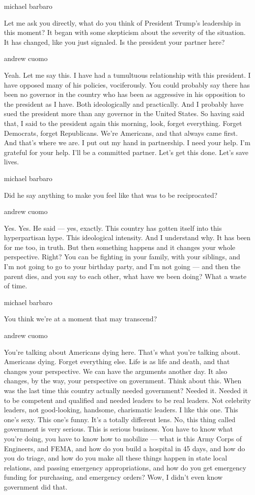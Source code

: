 michael barbaro

Let me ask you directly, what do you think of President Trump's
leadership in this moment? It began with some skepticism about the
severity of the situation. It has changed, like you just signaled. Is
the president your partner here?

andrew cuomo

Yeah. Let me say this. I have had a tumultuous relationship with this
president. I have opposed many of his policies, vociferously. You could
probably say there has been no governor in the country who has been as
aggressive in his opposition to the president as I have. Both
ideologically and practically. And I probably have sued the president
more than any governor in the United States. So having said that, I said
to the president again this morning, look, forget everything. Forget
Democrats, forget Republicans. We're Americans, and that always came
first. And that's where we are. I put out my hand in partnership. I need
your help. I'm grateful for your help. I'll be a committed partner.
Let's get this done. Let's save lives.

michael barbaro

Did he say anything to make you feel like that was to be reciprocated?

andrew cuomo

Yes. Yes. He said --- yes, exactly. This country has gotten itself into
this hyperpartisan hype. This ideological intensity. And I understand
why. It has been for me too, in truth. But then something happens and it
changes your whole perspective. Right? You can be fighting in your
family, with your siblings, and I'm not going to go to your birthday
party, and I'm not going --- and then the parent dies, and you say to
each other, what have we been doing? What a waste of time.

michael barbaro

You think we're at a moment that may transcend?

andrew cuomo

You're talking about Americans dying here. That's what you're talking
about. Americans dying. Forget everything else. Life is as life and
death, and that changes your perspective. We can have the arguments
another day. It also changes, by the way, your perspective on
government. Think about this. When was the last time this country
actually needed government? Needed it. Needed it to be competent and
qualified and needed leaders to be real leaders. Not celebrity leaders,
not good-looking, handsome, charismatic leaders. I like this one. This
one's sexy. This one's funny. It's a totally different lens. No, this
thing called government is very serious. This is serious business. You
have to know what you're doing, you have to know how to mobilize ---
what is this Army Corps of Engineers, and FEMA, and how do you build a
hospital in 45 days, and how do you do triage, and how do you make all
these things happen in state local relations, and passing emergency
appropriations, and how do you get emergency funding for purchasing, and
emergency orders? Wow, I didn't even know government did that.

